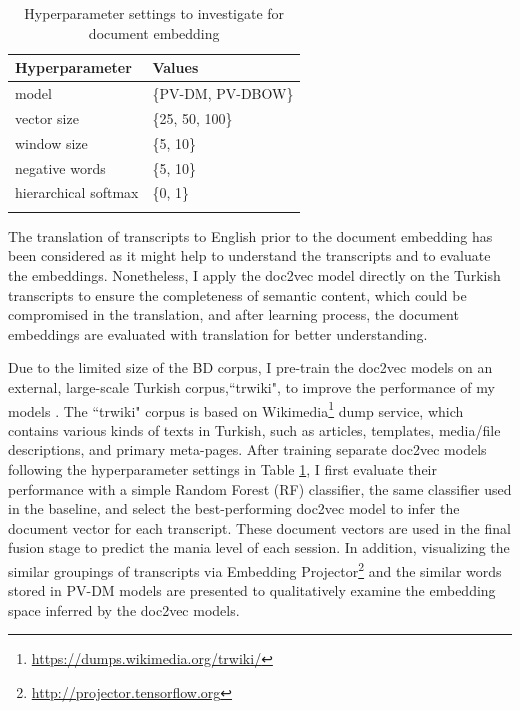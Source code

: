 \begin{table}[ht]
    \centering
    \caption{Hyperparameter settings to investigate for document embedding}
    \begin{tabular}{l|l}
        \Xhline{2\arrayrulewidth}
        Hyperparameter & Values \\
        \hline
        model & \{PV-DM, PV-DBOW\} \\
        vector size & \{25, 50, 100\} \\
        window size & \{5, 10\} \\
        negative words & \{5, 10\} \\
        hierarchical softmax & \{0, 1\} \\
        \Xhline{2\arrayrulewidth}
    \end{tabular}
    \label{tab:param_doc2vec}
\end{table}

The translation of transcripts to English prior to the document embedding has been considered as it might help to understand the transcripts and to evaluate the embeddings. Nonetheless, I apply the doc2vec model directly on the Turkish transcripts to ensure the completeness of semantic content, which could be compromised in the translation, and after learning process, the document embeddings are evaluated with translation for better understanding. 

Due to the limited size of the BD corpus, I pre-train the doc2vec models on an external, large-scale Turkish corpus,``trwiki", to improve the performance of my models \cite{lau2016}. The ``trwiki" corpus is based on Wikimedia\footnote{\url{https://dumps.wikimedia.org/trwiki/}} dump service, which contains various kinds of texts in Turkish, such as articles, templates, media/file descriptions, and primary meta-pages. After training separate doc2vec models following the hyperparameter settings in Table \ref{tab:param_doc2vec}, I first evaluate their performance with a simple Random Forest (RF) classifier, the same classifier used in the baseline, and select the best-performing doc2vec model to infer the document vector for each transcript. These document vectors are used in the final fusion stage to predict the mania level of each session. In addition, visualizing the similar groupings of transcripts via Embedding Projector\footnote{\url{http://projector.tensorflow.org}} and the similar words stored in PV-DM models are presented to qualitatively examine the embedding space inferred by the doc2vec models.






